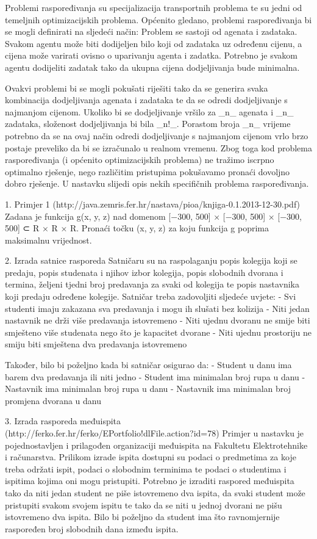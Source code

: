 Problemi raspoređivanja su specijalizacija transportnih problema te su jedni od temeljnih optimizacijskih problema.
Općenito gledano, problemi raspoređivanja bi se mogli definirati na sljedeći način:
Problem se sastoji od agenata i zadataka. Svakom agentu može biti dodijeljen bilo koji od zadataka uz određenu cijenu, a cijena
može varirati ovisno o uparivanju agenta i zadatka. Potrebno je svakom agentu dodijeliti zadatak tako da ukupna cijena dodjeljivanja
bude minimalna.

Ovakvi problemi bi se mogli pokušati riješiti tako da se generira svaka kombinacija dodjeljivanja agenata i zadataka te da se
odredi dodjeljivanje s najmanjom cijenom. Ukoliko bi se dodjeljivanje vršilo za _n_ agenata i _n_ zadataka, složenost dodjeljivanja bi bila
_n!_. Porastom broja _n_ vrijeme potrebno da se na ovaj način odredi dodjeljivanje s najmanjom cijenom vrlo brzo postaje preveliko da bi se
izračunalo u realnom vremenu. Zbog toga kod problema raspoređivanja (i općenito optimizacijskih problema) ne tražimo iscrpno optimalno rješenje,
nego različitim pristupima pokušavamo pronaći dovoljno dobro rješenje. U nastavku slijedi opis nekih specifičnih problema raspoređivanja.

1. Primjer 1 (http://java.zemris.fer.hr/nastava/pioa/knjiga-0.1.2013-12-30.pdf)
Zadana je funkcija g(x, y, z) nad domenom [−300, 500] × [−300, 500] × [−300, 500] ⊂
R × R × R. Pronaći točku (x, y, z) za koju funkcija g poprima maksimalnu vrijednost.

2. Izrada satnice rasporeda
Satničaru su na raspolaganju popis kolegija koji se predaju, popis studenata i njihov izbor kolegija, popis slobodnih dvorana i termina,
željeni tjedni broj predavanja za svaki od kolegija te popis nastavnika koji predaju određene kolegije. Satničar treba zadovoljiti
sljedeće uvjete:
  - Svi studenti imaju zakazana sva predavanja i mogu ih slušati bez kolizija
  - Niti jedan nastavnik ne drži više predavanja istovremeno
  - Niti ujednu dvoranu ne smije biti smješteno više studenata nego što je kapacitet dvorane
  - Niti ujednu prostoriju ne smiju biti smještena dva predavanja istovremeno

Također, bilo bi poželjno kada bi satničar osigurao da:
  - Student u danu ima barem dva predavanja ili niti jedno
  - Student ima minimalan broj rupa u danu
  - Nastavnik ima minimalan broj rupa u danu
  - Nastavnik ima minimalan broj promjena dvorana u danu



3. Izrada rasporeda međuispita (http://ferko.fer.hr/ferko/EPortfolio!dlFile.action?id=78)
Primjer u nastavku je pojednostavljen i prilagođen organizaciji međuispita na Fakultetu Elektrotehnike i računarstva.
Prilikom izrade ispita dostupni su podaci o predmetima za koje treba održati ispit, podaci o slobodnim terminima te
podaci o studentima i ispitima kojima oni mogu pristupiti. Potrebno je izraditi raspored međuispita tako da niti jedan
student ne piše istovremeno dva ispita, da svaki student može pristupiti svakom svojem ispitu
te tako da se niti u jednoj dvorani ne pišu istovremeno dva ispita. Bilo bi poželjno
da student ima što ravnomjernije raspoređen broj slobodnih dana između ispita.

